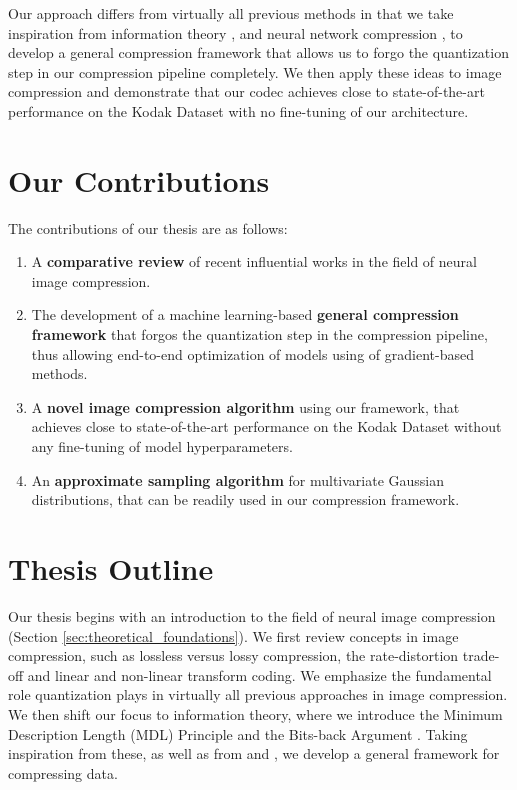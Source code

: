 \par
Our approach differs from virtually all previous methods in that we take
inspiration from information theory \cite{rissanen1986stochastic},
\cite{harsha2007communication} and neural network compression
\cite{hinton1993keeping}, \cite{havasi2018minimal} to develop a general compression
framework that allows us to forgo the quantization step in our compression
pipeline completely. We then apply these ideas to image compression and
demonstrate that our codec achieves close to state-of-the-art performance on the
Kodak Dataset \cite{kodakdataset} with no fine-tuning of our architecture.

\section{Our Contributions}
\par
The contributions of our thesis are as follows:
\begin{enumerate}
\item A \textbf{comparative review} of recent influential works in the field of
  neural image compression.

\item The development of a machine learning-based \textbf{general compression
    framework} that forgos the quantization step in the compression pipeline,
  thus allowing end-to-end optimization of models using of gradient-based methods.

\item A \textbf{novel image compression algorithm} using our framework, that 
  achieves close to state-of-the-art performance on the Kodak Dataset
  \cite{kodakdataset} without any fine-tuning of model hyperparameters.

\item An \textbf{approximate sampling algorithm} for multivariate Gaussian
  distributions, that can be readily used in our compression framework.
\end{enumerate}

\section{Thesis Outline}
\par 
Our thesis begins with an introduction to the field of neural image compression
(Section \ref{sec:theoretical_foundations}).
We first review concepts in image compression, such as lossless versus lossy
compression, the rate-distortion trade-off and linear and non-linear transform
coding. We emphasize the fundamental role quantization plays in virtually all
previous approaches in image compression. We then shift our focus to information
theory, where we introduce the Minimum Description Length (MDL) Principle
\cite{rissanen1981universal} and the Bits-back Argument
\cite{hinton1993keeping}. Taking inspiration from these, as well as from
\cite{harsha2007communication} and \cite{havasi2018minimal}, we develop a
general framework for compressing data.

